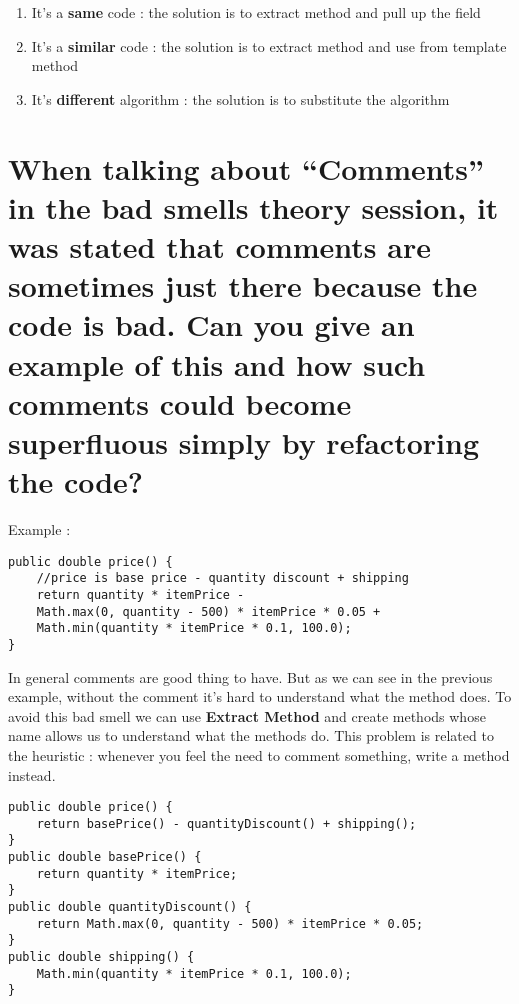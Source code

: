 \begin{enumerate}
\item It's a \textbf{same} code : the solution is to extract method and pull up the field
\item It's a \textbf{similar} code : the solution is to extract method and use from template method
\item It's \textbf{different} algorithm : the solution is to substitute the algorithm
\end{enumerate}






\section{When talking about “Comments” in the bad smells theory session, it was stated that comments are sometimes just there because the code is bad. Can you give an example of this and how such comments could become superfluous simply by refactoring the code?}

Example : \\

\begin{lstlisting}
public double price() {
	//price is base price - quantity discount + shipping
    return quantity * itemPrice -
    Math.max(0, quantity - 500) * itemPrice * 0.05 +
    Math.min(quantity * itemPrice * 0.1, 100.0);
}
\end{lstlisting}

In general comments are good thing to have. But as we can see in the previous example, without the comment it's hard to understand what the method does. To avoid this bad smell we can use \textbf{Extract Method} and create methods whose name allows us to understand what the methods do. This problem is related to the heuristic : whenever you feel the need to comment something, write a method instead.

\begin{lstlisting}
public double price() {
	return basePrice() - quantityDiscount() + shipping();
}
public double basePrice() {
	return quantity * itemPrice;
}
public double quantityDiscount() {
	return Math.max(0, quantity - 500) * itemPrice * 0.05;
}
public double shipping() {
	Math.min(quantity * itemPrice * 0.1, 100.0);
}
\end{lstlisting}